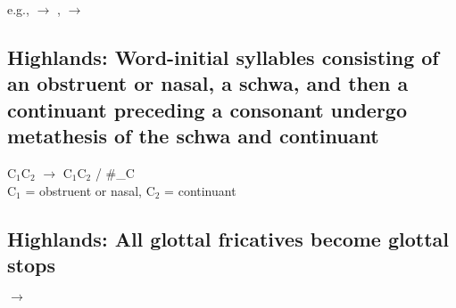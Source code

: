 e.g.,   $\to$ ,   $\to$ 

\subsection{{\sc Highlands:} Word-initial syllables consisting of an obstruent or nasal, a schwa, and then a continuant preceding a consonant undergo metathesis of the schwa and continuant}

\begin{center}
    C$_1$\schwa C$_2$ $\to$ C$_1$C$_2$\schwa{} / \#\_C\\
    C$_1$ = obstruent or nasal, C$_2$ = continuant
\end{center}

\subsection{{\sc Highlands:} All glottal fricatives become glottal stops}

\begin{center}
     $\to$ \phipa{\glotstop}
\end{center}